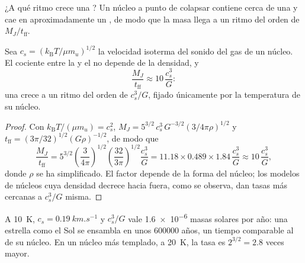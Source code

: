 ¿A qué ritmo crece una ? Un núcleo a punto de colapsar contiene cerca de una 
y cae en aproximadamente un , de modo que la masa llega a un ritmo del orden de
$M_J/t_{\mathrm{ff}}$.

\begin{proposition}
\label{prop:b2:ism-star-formation:accretion}
Sea $c_s = (k_{\mathrm B}T/\mu m_u)^{1/2}$ la velocidad isoterma del sonido
del gas de un núcleo. El cociente entre la  y el  no
depende de la densidad, y
\[
  \frac{M_J}{t_{\mathrm{ff}}} \approx 10\,\frac{c_s^3}{G}:
\]
una  crece a un ritmo del orden de $c_s^3/G$, fijado únicamente por la temperatura de su
núcleo.
\end{proposition}

\begin{proof}
Con $k_{\mathrm B}T/(\mu m_u) = c_s^2$, $M_J = 5^{3/2}\,c_s^3\,G^{-3/2}
(3/4\pi\rho)^{1/2}$ y $t_{\mathrm{ff}} = (3\pi/32)^{1/2}(G\rho)^{-1/2}$, de modo que
\[
  \frac{M_J}{t_{\mathrm{ff}}} = 5^{3/2}\left(\frac{3}{4\pi}\right)^{1/2}
  \left(\frac{32}{3\pi}\right)^{1/2}\frac{c_s^3}{G}
  = 11.18\times0.489\times1.84\,\frac{c_s^3}{G} \approx 10\,\frac{c_s^3}{G},
\]
donde $\rho$ se ha simplificado. El factor depende de la forma del núcleo;
los modelos de núcleos cuya densidad decrece hacia fuera, como se observa, dan tasas
más cercanas a $c_s^3/G$ misma.
\end{proof}

A \qty{10}{K}, $c_s = \qty{0.19}{km.s^{-1}}$ y $c_s^3/G$ vale
\num{1.6e-6} masas solares por año: una estrella como el Sol se ensambla en unos
\num{600000} años, un tiempo comparable al  de su núcleo.
En un núcleo más templado, a \qty{20}{K}, la tasa es $2^{3/2} = 2.8$ veces mayor.

